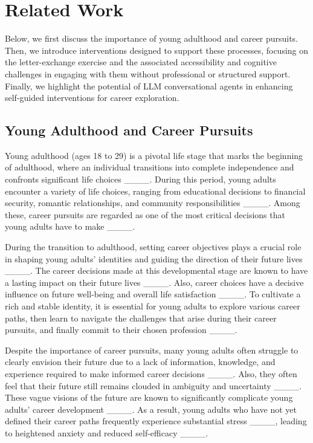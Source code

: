 \section{Related Work}
Below, we first discuss the importance of young adulthood and career pursuits. Then, we introduce interventions designed to support these processes, focusing on the letter-exchange exercise and the associated accessibility and cognitive challenges in engaging with them without professional or structured support. Finally, we highlight the potential of LLM conversational agents in enhancing self-guided interventions for career exploration.


\subsection{Young Adulthood and Career Pursuits}

Young adulthood (ages 18 to 29) is a pivotal life stage that marks the beginning of adulthood, where an individual transitions into complete independence and confronts significant life choices ____. During this period, young adults encounter a variety of life choices, ranging from educational decisions to financial security, romantic relationships, and community responsibilities ____. Among these, career pursuits are regarded as one of the most critical decisions that young adults have to make ____.

During the transition to adulthood, setting career objectives plays a crucial role in shaping young adults' identities and guiding the direction of their future lives ____. The career decisions made at this developmental stage are known to have a lasting impact on their future lives ____. Also, career choices have a decisive influence on future well-being and overall life satisfaction ____.
To cultivate a rich and stable identity, it is essential for young adults to explore various career paths, then learn to navigate the challenges that arise during their career pursuits, and finally commit to their chosen profession ____. 

Despite the importance of career pursuits, many young adults often struggle to clearly envision their future due to a lack of information, knowledge, and experience required to make informed career decisions ____. Also, they often feel that their future still remains clouded in ambiguity and uncertainty ____. These vague visions of the future are known to significantly complicate young adults’ career development ____. As a result, young adults who have not yet defined their career paths frequently experience substantial stress ____, leading to heightened anxiety and reduced self-efficacy ____.

